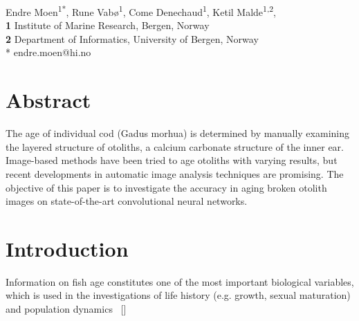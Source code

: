 \documentclass[10pt,letterpaper]{article}
\newcommand\Mycite[1]{%
  \citeauthor{#1}~[\citeyear{#1}]}
\begin{document}
\vspace*{0.2in}

\begin{flushleft}
{\Large
\textbf{}
}
\newline


Endre Moen\textsuperscript{1*},
Rune Vabø\textsuperscript{1},
Come Denechaud\textsuperscript{1},
Ketil Malde\textsuperscript{1,2},
\\
\bigskip
\textbf{1} Institute of Marine Research, Bergen, Norway
\\
\textbf{2} Department of Informatics, University of Bergen, Norway
\\
\bigskip
* endre.moen@hi.no

\end{flushleft}

\linenumbers

\section*{Abstract}

The age of individual cod (Gadus morhua) is determined by manually examining the layered structure of otoliths, a calcium carbonate structure of the inner ear. Image-based methods have been tried to age otoliths with varying results, but recent developments in automatic image analysis techniques are promising. The objective of this paper is to
investigate the accuracy in aging broken otolith images on state-of-the-art convolutional neural networks.


\section*{Introduction}

Information on fish age constitutes one of the most important biological variables, which is used
in the investigations of life history (e.g. growth, sexual maturation) and population dynamics
\Mycite{campana2001accuracy}
\end{document}
